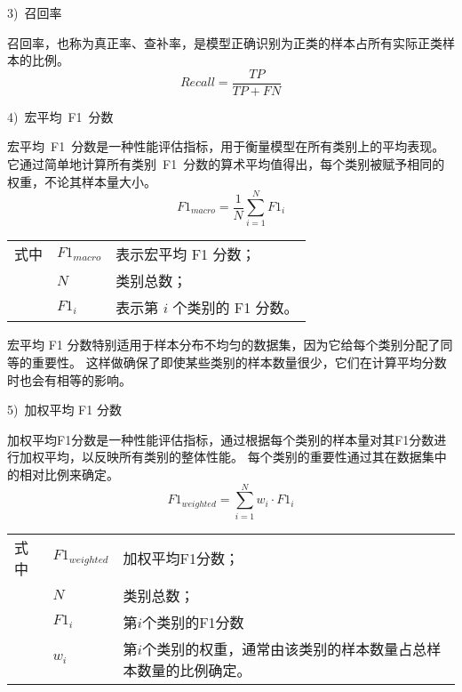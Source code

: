 3)~召回率\par
召回率，也称为真正率、查补率，是模型正确识别为正类的样本占所有实际正类样本的比例。
\begin{equation}
	\label{eq:val_score3}
	Recall = \frac{TP}{TP + FN}
\end{equation}

4)~宏平均~F1~分数\par
宏平均~F1~分数是一种性能评估指标，用于衡量模型在所有类别上的平均表现。
它通过简单地计算所有类别~F1~分数的算术平均值得出，每个类别被赋予相同的权重，不论其样本量大小。
\begin{equation}
	\label{eq:val_score4}
	F1_{macro} = \frac{1}{N} \sum\limits_{i=1}^{N} F1_i
\end{equation}
\begin{flushleft}
	\renewcommand\arraystretch{1.25}
	\begin{tabularx}{\textwidth}{@{}>{\normalsize\rm}l@{\quad}>{\normalsize\rm}l@{——}>{\normalsize\rm}X@{}}
		式中 & $F1_{macro}$ & 表示宏平均 F1 分数；          \\
		     & $N$          & 类别总数；                    \\
		     & $F1_i$       & 表示第 $i$ 个类别的 F1 分数。 \\
	\end{tabularx}\vspace{.5ex}
\end{flushleft}
宏平均 F1 分数特别适用于样本分布不均匀的数据集，因为它给每个类别分配了同等的重要性。
这样做确保了即使某些类别的样本数量很少，它们在计算平均分数时也会有相等的影响。\par

5)~加权平均 F1 分数\par
加权平均F1分数是一种性能评估指标，通过根据每个类别的样本量对其F1分数进行加权平均，以反映所有类别的整体性能。
每个类别的重要性通过其在数据集中的相对比例来确定。
\begin{equation}
	\label{eq:val_score5}
	F1_{weighted} = \sum\limits_{i=1}^{N} w_i \cdot F1_i
\end{equation}
\begin{flushleft}
	\renewcommand\arraystretch{1.25}
	\begin{tabularx}{\textwidth}{@{}>{\normalsize\rm}l@{\quad}>{\normalsize\rm}l@{——}>{\normalsize\rm}X@{}}
		式中 & $F1_{weighted}$ & 加权平均F1分数；                                                  \\
		     & $N$             & 类别总数；                                                        \\
		     & $F1_i$          & 第$i$个类别的F1分数                                               \\
		     & $w_i$           & 第$i$个类别的权重，通常由该类别的样本数量占总样本数量的比例确定。 \\
	\end{tabularx}\vspace{.5ex}
\end{flushleft}


